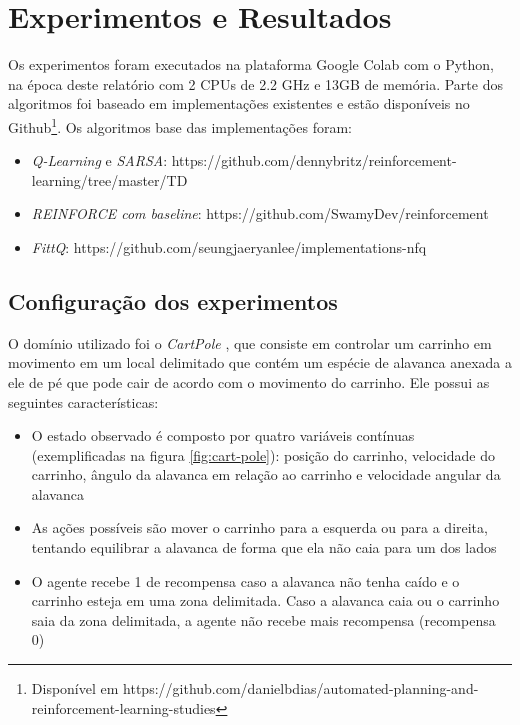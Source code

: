 \documentclass[letterpaper]{article}
\begin{document}
\section{Experimentos e Resultados}

Os experimentos foram executados na plataforma Google Colab com o Python, na época deste relatório com 2 CPUs de 2.2 GHz e 13GB de memória. Parte dos algoritmos foi baseado em implementações existentes e estão disponíveis no Github\footnote{Disponível em https://github.com/danielbdias/automated-planning-and-reinforcement-learning-studies}. Os algoritmos base das implementações foram:

\begin{itemize}
  \item \textit{Q-Learning} e \textit{SARSA}: https://github.com/dennybritz/reinforcement-learning/tree/master/TD
  \item \textit{REINFORCE com baseline}: https://github.com/SwamyDev/reinforcement
  \item \textit{FittQ}: https://github.com/seungjaeryanlee/implementations-nfq
\end{itemize}

\subsection{Configuração dos experimentos}

O domínio utilizado foi o \textit{CartPole} \cite{SuttonBarto-2018}, que consiste em controlar um carrinho em movimento em um local delimitado que contém um espécie de alavanca anexada a ele de pé que pode cair de acordo com o movimento do carrinho. Ele possui as seguintes características:

\begin{itemize}
  \item O estado observado é composto por quatro variáveis contínuas (exemplificadas na figura \ref{fig:cart-pole}): posição do carrinho, velocidade do carrinho, ângulo da alavanca em relação ao carrinho e velocidade angular da alavanca
  \item As ações possíveis são mover o carrinho para a esquerda ou para a direita, tentando equilibrar a alavanca de forma que ela não caia para um dos lados
  \item O agente recebe 1 de recompensa caso a alavanca não tenha caído e o carrinho esteja em uma zona delimitada. Caso a alavanca caia ou o carrinho saia da zona delimitada, a agente não recebe mais recompensa (recompensa 0)
\end{itemize}
\end{document}
